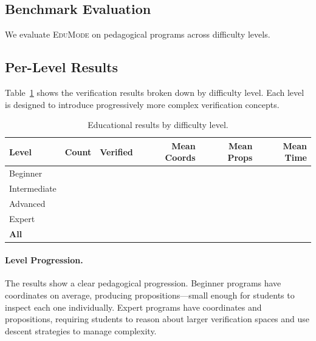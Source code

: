 \documentclass[11pt]{article}
\newcommand{\EduMode}{\textsc{EduMode}}
\begin{document}
\subsection{Benchmark Evaluation}

We evaluate \EduMode{} on \ppLXVIprogramCount{} pedagogical programs across
\ppLXVIlevelCount{} difficulty levels.

\subsection{Per-Level Results}

Table~\ref{tab:edu-levels} shows the verification results broken down by
difficulty level. Each level is designed to introduce progressively more
complex verification concepts.

\begin{table}[t]
\centering
\caption{Educational results by difficulty level.}
\label{tab:edu-levels}
\begin{tabular}{lrrrrr}
\toprule
\textbf{Level} & \textbf{Count} & \textbf{Verified} &
  \textbf{Mean Coords} & \textbf{Mean Props} & \textbf{Mean Time} \\
\midrule
Beginner     & \ppLXVIBeginnerCount{} & \ppLXVIBeginnerVerified{} &
  \ppLXVIBeginnerMeanCoords{} & \ppLXVIBeginnerMeanProps{} &
  \ppLXVIBeginnerMeanTime{} \\
Intermediate & \ppLXVIIntermediateCount{} & \ppLXVIIntermediateVerified{} &
  \ppLXVIIntermediateMeanCoords{} & \ppLXVIIntermediateMeanProps{} &
  \ppLXVIIntermediateMeanTime{} \\
Advanced     & \ppLXVIAdvancedCount{} & \ppLXVIAdvancedVerified{} &
  \ppLXVIAdvancedMeanCoords{} & \ppLXVIAdvancedMeanProps{} &
  \ppLXVIAdvancedMeanTime{} \\
Expert       & \ppLXVIExpertCount{} & \ppLXVIExpertVerified{} &
  \ppLXVIExpertMeanCoords{} & \ppLXVIExpertMeanProps{} &
  \ppLXVIExpertMeanTime{} \\
\midrule
\textbf{All} & \ppLXVIprogramCount{} & \ppLXVIverified{} &
  \ppLXVIcoordsMean{} & \ppLXVIpropsMean{} & \ppLXVItimeMean{} \\
\bottomrule
\end{tabular}
\end{table}

\paragraph{Level Progression.}
The results show a clear pedagogical progression. Beginner programs have
\ppLXVIBeginnerMeanCoords{} coordinates on average, producing
\ppLXVIBeginnerMeanProps{} propositions---small enough for students to
inspect each one individually. Expert programs have \ppLXVIExpertMeanCoords{}
coordinates and \ppLXVIExpertMeanProps{} propositions, requiring students to
reason about larger verification spaces and use descent strategies to manage
complexity.
\end{document}
